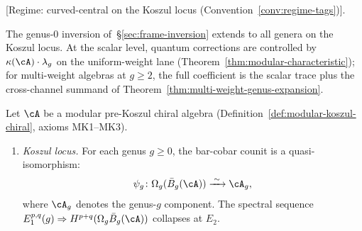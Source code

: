 \begin{theorem}\label{thm:higher-genus-inversion}
\textup{[}Regime: curved-central on the Koszul locus
\textup{(}Convention~\textup{\ref{conv:regime-tags})].}

\smallskip\noindent
The genus-$0$ inversion of~\S\ref{sec:frame-inversion} extends to all
genera on the Koszul locus. At the scalar level, quantum corrections
are controlled by $\kappa(\cA) \cdot \lambda_g$ on the
uniform-weight lane
\textup{(}Theorem~\textup{\ref{thm:modular-characteristic})}; for
multi-weight algebras at $g \geq 2$, the full coefficient is the
scalar trace plus the cross-channel summand of
Theorem~\textup{\ref{thm:multi-weight-genus-expansion}}.

Let $\cA$ be a modular pre-Koszul chiral algebra
\textup{(}Definition~\textup{\ref{def:modular-koszul-chiral}},
axioms \textup{MK1--MK3)}.
\begin{enumerate}[label=\textup{(\alph*)}]
\item \emph{Koszul locus.}
For each genus $g \geq 0$, the bar-cobar counit is a
quasi-isomorphism:
\[\psi_g \colon \Omega_g(\bar{B}_g(\cA))
\xrightarrow{\;\sim\;} \cA_g,\]
where $\cA_g$ denotes the genus-$g$ component.
The spectral sequence $E_1^{p,q}(g) \Rightarrow
H^{p+q}(\Omega_g \bar{B}_g(\cA))$ collapses at $E_2$.
\end{enumerate}
\end{theorem}

